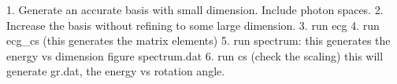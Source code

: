 1. Generate an accurate basis with small dimension. Include photon
spaces. 
2. Increase the basis without refining to some large dimension.
3. run ecg
4. run ecg_cs (this generates the matrix elements)
5. run spectrum: this generates the energy vs dimension figure spectrum.dat
6. run cs (check the scaling) this will generate gr.dat, the energy vs
rotation angle.
